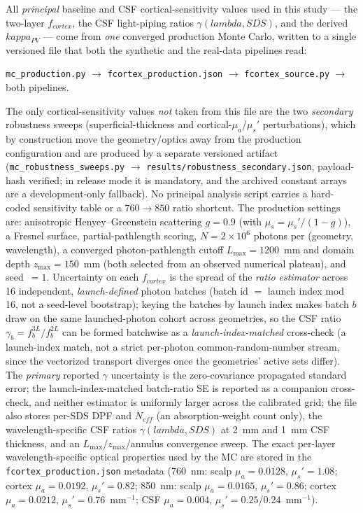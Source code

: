 \documentclass[12pt]{article}
\def\kappa{kappa}%
\def\lambda{lambda}%
\def\text#1{#1}%
\begin{document}
All \emph{principal} baseline and CSF cortical-sensitivity values used in this study --- the two-layer $f_{\text{cortex}}$, the CSF light-piping ratios $\gamma(\lambda,\text{SDS})$, and the derived $\kappa_{\text{PV}}$ --- come from \emph{one} converged production Monte Carlo, written to a single versioned file that both the synthetic and the real-data pipelines read:
\begin{center}\small
\texttt{mc\_production.py} $\rightarrow$ \texttt{fcortex\_production.json} $\rightarrow$
\texttt{fcortex\_source.py} $\rightarrow$ both pipelines.
\end{center}
The only cortical-sensitivity values \emph{not} taken from this file are the two \emph{secondary} robustness sweeps (superficial-thickness and cortical-$\mu_a$/$\mu_s'$ perturbations), which by construction move the geometry/optics away from the production configuration and are produced by a separate versioned artifact (\texttt{mc\_robustness\_sweeps.py} $\rightarrow$ \texttt{results/robustness\_secondary.json}, payload-hash verified; in release mode it is mandatory, and the archived constant arrays are a development-only fallback). No principal analysis script carries a hard-coded sensitivity table or a $760\rightarrow850$ ratio shortcut. The production settings are: anisotropic Henyey--Greenstein scattering $g=0.9$ (with $\mu_s=\mu_s'/(1-g)$), a Fresnel surface, partial-pathlength scoring, $N=2\times10^{6}$ photons per (geometry, wavelength), a converged photon-pathlength cutoff $L_{\max}=1200$~mm and domain depth $z_{\max}=150$~mm (both selected from an observed numerical plateau), and seed~$=1$. Uncertainty on each $f_{\text{cortex}}$ is the spread of the \emph{ratio estimator} across 16 independent, \emph{launch-defined} photon batches (batch id $=$ launch index mod 16, not a seed-level bootstrap); keying the batches by launch index makes batch $b$ draw on the same launched-photon cohort across geometries, so the CSF ratio $\gamma_b=f^{3L}_b/f^{2L}_b$ can be formed batchwise as a \emph{launch-index-matched} cross-check (a launch-index match, not a strict per-photon common-random-number stream, since the vectorized transport diverges once the geometries' active sets differ). The \emph{primary} reported $\gamma$ uncertainty is the zero-covariance propagated standard error; the launch-index-matched batch-ratio SE is reported as a companion cross-check, and neither estimator is uniformly larger across the calibrated grid; the file also stores per-SDS DPF and $N_{\text{eff}}$ (an absorption-weight count only), the wavelength-specific CSF ratios $\gamma(\lambda,\text{SDS})$ at 2~mm and 1~mm CSF thickness, and an $L_{\max}$/$z_{\max}$/annulus convergence sweep. The exact per-layer wavelength-specific optical properties used by the MC are stored in the \texttt{fcortex\_production.json} metadata (760~nm: scalp $\mu_a{=}0.0128$, $\mu_s'{=}1.08$; cortex $\mu_a{=}0.0192$, $\mu_s'{=}0.82$; 850~nm: scalp $\mu_a{=}0.0165$, $\mu_s'{=}0.86$; cortex $\mu_a{=}0.0212$, $\mu_s'{=}0.76$~mm$^{-1}$; CSF $\mu_a{=}0.004$, $\mu_s'{=}0.25$/0.24~mm$^{-1}$).
\end{document}

